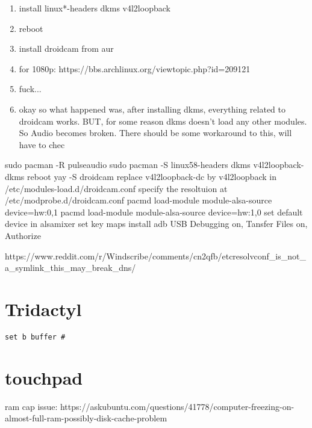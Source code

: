\documentclass[11pt, article, a4paper]{memoir}
\begin{document}
\begin{enumerate}
    \item install linux*-headers dkms v4l2loopback 
    \item reboot
    \item install droidcam from aur
    \item for 1080p: https://bbs.archlinux.org/viewtopic.php?id=209121
    \item fuck... 
    \item okay so what happened was, after installing dkms, everything related to droidcam
        works. BUT, for some reason dkms doesn't load any other modules. So Audio becomes
        broken. There should be some workaround to this, will have to chec
\end{enumerate}

sudo pacman -R pulseaudio
sudo pacman -S linux58-headers dkms v4l2loopback-dkms
reboot
yay -S droidcam
replace v4l2loopback-dc by v4l2loopback in /etc/modules-load.d/droidcam.conf
specify the resoltuion at /etc/modprobe.d/droidcam.conf
pacmd load-module module-alsa-source device=hw:0,1
pacmd load-module module-alsa-source device=hw:1,0
set default device in alsamixer
set key maps
install adb
USB Debugging on, Tansfer Files on, Authorize


https://www.reddit.com/r/Windscribe/comments/cn2qfb/etcresolvconf_is_not_a_symlink_this_may_break_dns/


\section{Tridactyl}

\texttt{set b buffer #}


\section{touchpad}


ram cap issue: https://askubuntu.com/questions/41778/computer-freezing-on-almost-full-ram-possibly-disk-cache-problem
\end{document}
